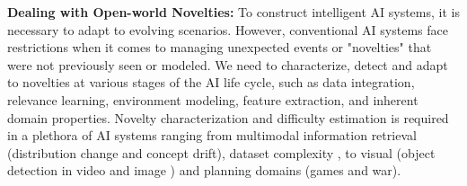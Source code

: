 \textbf{Dealing with Open-world Novelties:}
%
%
To construct intelligent AI systems, it is necessary to adapt to evolving scenarios. However, conventional AI systems face restrictions when it comes to managing unexpected events or "novelties" that were not previously seen or modeled. We need to characterize, detect and adapt to novelties at various stages of the AI life cycle, such as data integration, relevance learning, environment modeling, feature extraction, and inherent domain properties. Novelty characterization and difficulty estimation is required in a plethora of AI systems ranging from multimodal information retrieval \cite{solaiman2022open} (distribution change and concept drift), dataset complexity \cite{solaiman2023domainComplexity}, to visual (object detection in video and image \cite{nesen2021dataset}) and planning domains (games \cite{solaiman2022measurement} and war).
